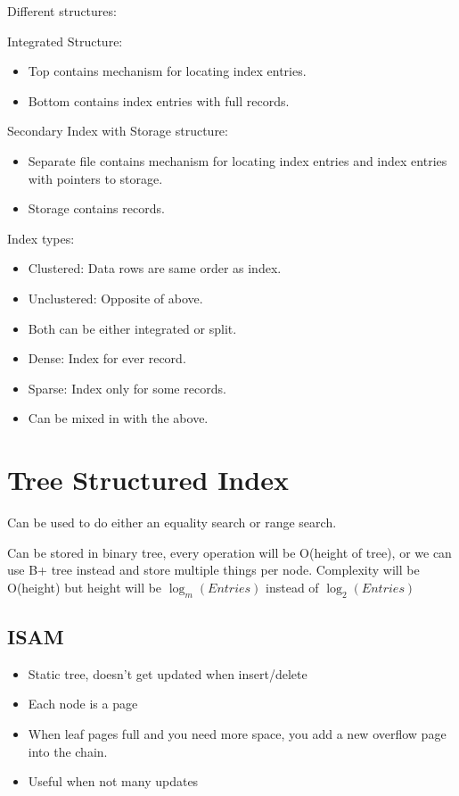 \documentclass[landscape, letterpaper]{extarticle}
\begin{document}
\begin{multicols}{3}
    Different structures:

    Integrated Structure:
    \begin{itemize}[noitemsep,nolistsep]
        \item Top contains mechanism for locating index entries.
        \item Bottom contains index entries with full records.
    \end{itemize}

    Secondary Index with Storage structure:
    \begin{itemize}[noitemsep,nolistsep]
        \item Separate file contains mechanism for locating index entries and index entries with pointers to storage.
        \item Storage contains records.
    \end{itemize}

    Index types:
    \begin{itemize}[noitemsep,nolistsep]
        \item Clustered: Data rows are same order as index.
        \item Unclustered: Opposite of above.
        \item Both can be either integrated or split.
        \item Dense: Index for ever record.
        \item Sparse: Index only for some records.
        \item Can be mixed in with the above.
    \end{itemize}

    \section*{Tree Structured Index}
    Can be used to do either an equality search or range search.

    Can be stored in binary tree, every operation will be O(height of tree), or we can use B+ tree instead and store multiple things per node. Complexity will be O(height) but height will be \(\log_{m}(Entries)\) instead of \(\log_{2}(Entries)\)

    \subsection*{ISAM}
    \begin{itemize}[noitemsep,nolistsep]
        \item Static tree, doesn't get updated when insert/delete
        \item Each node is a page
        \item When leaf pages full and you need more space, you add a new overflow page into the chain.
        \item Useful when not many updates
    \end{itemize}


\end{multicols}
\end{document}
